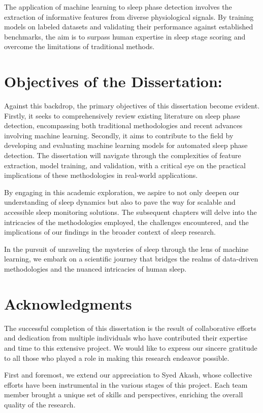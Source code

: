 \documentclass[12pt, a4paper,oneside]{book}
\numberwithin{equation}{section}
\begin{document}
The application of machine learning to sleep phase detection involves the extraction of informative features from diverse physiological signals. By training models on labeled datasets and validating their performance against established benchmarks, the aim is to surpass human expertise in sleep stage scoring and overcome the limitations of traditional methods.

\section{Objectives of the Dissertation:}\label{sec:1.4}

Against this backdrop, the primary objectives of this dissertation become evident. Firstly, it seeks to comprehensively review existing literature on sleep phase detection, encompassing both traditional methodologies and recent advances involving machine learning. Secondly, it aims to contribute to the field by developing and evaluating machine learning models for automated sleep phase detection. The dissertation will navigate through the complexities of feature extraction, model training, and validation, with a critical eye on the practical implications of these methodologies in real-world applications.

By engaging in this academic exploration, we aspire to not only deepen our understanding of sleep dynamics but also to pave the way for scalable and accessible sleep monitoring solutions. The subsequent chapters will delve into the intricacies of the methodologies employed, the challenges encountered, and the implications of our findings in the broader context of sleep research.

In the pursuit of unraveling the mysteries of sleep through the lens of machine learning, we embark on a scientific journey that bridges the realms of data-driven methodologies and the nuanced intricacies of human sleep.

\section{Acknowledgments}\label{sec:1.5}
The successful completion of this dissertation is the result of collaborative efforts and dedication from multiple individuals who have contributed their expertise and time to this extensive project. We would like to express our sincere gratitude to all those who played a role in making this research endeavor possible.

First and foremost, we extend our appreciation to Syed Akash, whose collective efforts have been instrumental in the various stages of this project. Each team member brought a unique set of skills and perspectives, enriching the overall quality of the research.
\end{document}
